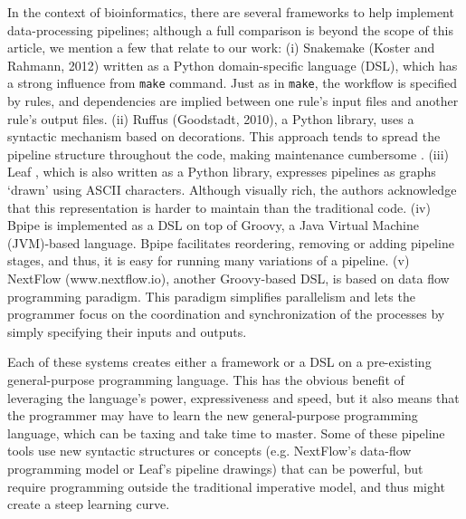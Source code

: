 In the context of bioinformatics, there are several frameworks to help implement data-processing pipelines; although a full comparison is beyond the scope of this article, we mention a few that relate to our work: (i) Snakemake (Koster and Rahmann, 2012) written as a Python domain-specific language (DSL), which has a strong influence from \texttt{make} command. Just as in \texttt{make}, the workflow is specified by rules, and dependencies are implied between one rule’s input files and another rule’s output files. (ii) Ruffus (Goodstadt, 2010), a Python library, uses a syntactic mechanism based on decorations. This approach tends to spread the pipeline structure throughout the code, making maintenance cumbersome \cite{sadedin2012bpipe}. (iii) Leaf \cite{napolitano2013bioinformatic}, which is also written as a Python library, expresses pipelines as graphs ‘drawn’ using ASCII characters. Although visually rich, the authors acknowledge that this representation is harder to maintain than the traditional code. (iv) Bpipe \cite{sadedin2012bpipe} is implemented as a DSL on top of Groovy, a Java Virtual Machine (JVM)-based language. Bpipe facilitates reordering, removing or adding pipeline stages, and thus, it is easy for running many variations of a pipeline. (v) NextFlow (www.nextflow.io), another Groovy-based DSL, is based on data flow programming paradigm. This paradigm simplifies parallelism and lets the programmer focus on the coordination and synchronization of the processes by simply specifying their inputs and outputs.

Each of these systems creates either a framework or a DSL on a pre-existing general-purpose programming language. This has the obvious benefit of leveraging the language’s power, expressiveness and speed, but it also means that the programmer may have to learn the new general-purpose programming language, which can be taxing and take time to master. Some of these pipeline tools use new syntactic structures or concepts (e.g. NextFlow’s data-flow programming model or Leaf’s pipeline drawings) that can be powerful, but require programming outside the traditional imperative model, and thus might create a steep learning curve.

